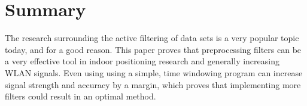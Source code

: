 \chapter{Summary}
\label{chap:summary}

The research surrounding the active filtering of data sets is a very popular topic today, and for a good reason.
This paper proves that preprocessing filters can be a very effective tool in indoor positioning research and generally increasing WLAN signals.
Even using using a simple, time windowing program can increase signal strength and accuracy by a margin, which proves that implementing more filters could result in an optimal method.
